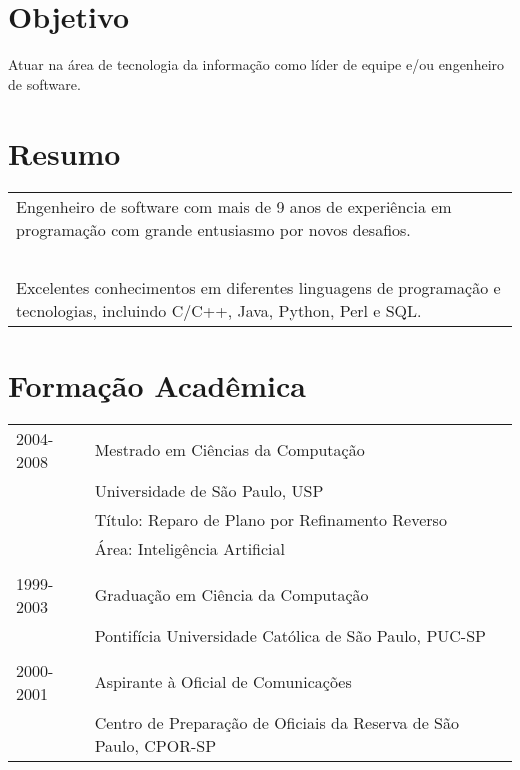\documentclass[a4paper, oneside, final]{scrartcl}
\begin{document}
\begin{center}
\textsc{\Huge{}}\\ \ \\

\section{Objetivo}
Atuar na área de tecnologia da informação como líder de equipe e/ou engenheiro de software.

\section{Resumo}

\begin{tabularx}{0.97\linewidth}{X}
  Engenheiro de software com mais de 9 anos de experiência em programação com grande entusiasmo por novos desafios. \\ \ \\
  Excelentes conhecimentos em diferentes linguagens de programação e tecnologias, incluindo C/C++, Java, Python, Perl e SQL.
\end{tabularx}

\section{Formação Acadêmica}

\begin{tabularx}{0.97\linewidth}{p{2cm}X}
2004-2008   & Mestrado em Ciências da Computação\\
            & Universidade de São Paulo, USP\\
            & Título: Reparo de Plano por Refinamento Reverso\\
            & Área:  Inteligência Artificial\\ \\

1999-2003   & Graduação em Ciência da Computação\\
            & Pontifícia Universidade Católica de São Paulo, PUC-SP\\ \\

2000-2001   & Aspirante à Oficial de Comunicações\\
            & Centro de Preparação de Oficiais da Reserva de São Paulo, CPOR-SP
\end{tabularx}


\end{center}
\end{document}
